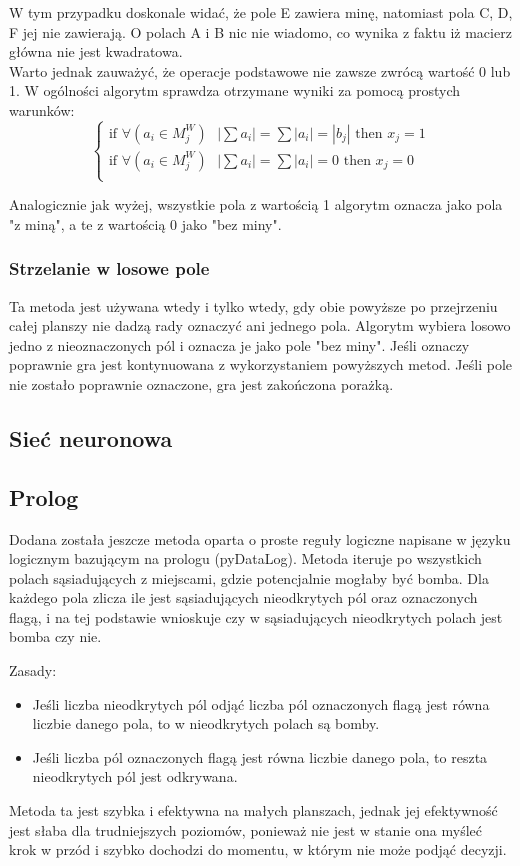 \documentclass{article} %
\begin{document}
W tym przypadku doskonale widać, że pole E zawiera minę, natomiast pola C, D, F jej nie zawierają. 
O polach A i B nic nie wiadomo, co wynika z faktu iż macierz główna nie jest kwadratowa. \\
Warto jednak zauważyć, że operacje podstawowe nie zawsze zwrócą wartość 0 lub 1. W ogólności
algorytm sprawdza otrzymane wyniki za pomocą prostych warunków: 
$$
\begin{cases}
 \text{if } \forall{(a_{i} \in M_{j}^W)} \text{ } |\sum{a_{i}}| = \sum{|a_{i}| = |b_{j}|}  \text{ then } x_{j}=1 \\
 \text{if } \forall{(a_{i} \in M_{j}^W)} \text{ } |\sum{a_{i}}| = \sum{|a_{i}|} = 0 \text{ then } x_{j}=0 \\
\end{cases}
$$

Analogicznie jak wyżej, wszystkie pola z wartością 1 algorytm oznacza jako pola "z miną", a te z wartością 0 jako "bez miny".

\subsubsection{Strzelanie w losowe pole}
Ta metoda jest używana wtedy i tylko wtedy, gdy obie powyższe po przejrzeniu całej planszy
nie dadzą rady oznaczyć ani jednego pola. Algorytm wybiera losowo jedno z nieoznaczonych pól
i oznacza je jako pole "bez miny". Jeśli oznaczy poprawnie gra jest kontynuowana z wykorzystaniem
 powyższych metod. Jeśli pole nie zostało poprawnie oznaczone, gra jest zakończona porażką.

\subsection{Sieć neuronowa}
\subsection{Prolog}
Dodana została jeszcze metoda oparta o proste reguły logiczne napisane w języku logicznym bazującym na prologu (pyDataLog).
Metoda iteruje po wszystkich polach sąsiadujących z miejscami, gdzie potencjalnie mogłaby być bomba.
Dla każdego pola zlicza ile jest sąsiadujących nieodkrytych pól oraz oznaczonych flagą, i na tej podstawie wnioskuje czy w sąsiadujących nieodkrytych polach jest bomba czy nie.

Zasady:
\begin{itemize}
    \item{Jeśli liczba nieodkrytych pól odjąć liczba pól oznaczonych flagą jest równa liczbie danego pola, to w nieodkrytych polach są bomby.}
    \item{Jeśli liczba pól oznaczonych flagą jest równa liczbie danego pola, to reszta nieodkrytych pól jest odkrywana.}
\end{itemize}
Metoda ta jest szybka i efektywna na małych planszach, jednak jej efektywność jest słaba dla trudniejszych poziomów, ponieważ nie jest w stanie ona myśleć krok w przód i szybko dochodzi do momentu, w którym nie może podjąć decyzji.
\end{document}
